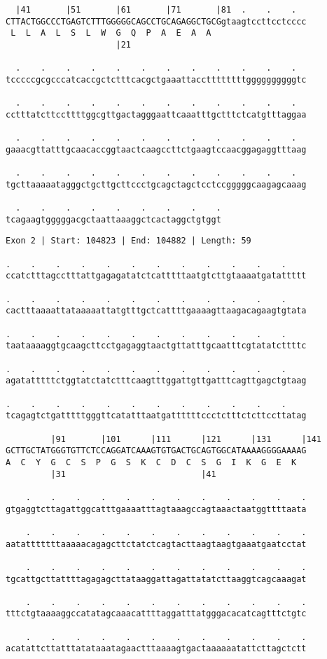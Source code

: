 \documentclass{article}
\begin{document}
\begin{Verbatim}
  |41       |51       |61       |71       |81  .    .    .  
CTTACTGGCCCTGAGTCTTTGGGGGCAGCCTGCAGAGGCTGCGgtaagtccttcctcccc
 L  L  A  L  S  L  W  G  Q  P  A  E  A  A                   
                      |21                                   
  
  .    .    .    .    .    .    .    .    .    .    .    .  
tcccccgcgcccatcaccgctctttcacgctgaaattaccttttttttggggggggggtc
  
  .    .    .    .    .    .    .    .    .    .    .    .  
cctttatcttccttttggcgttgactagggaattcaaatttgctttctcatgtttaggaa
  
  .    .    .    .    .    .    .    .    .    .    .    .  
gaaacgttatttgcaacaccggtaactcaagccttctgaagtccaacggagaggtttaag
  
  .    .    .    .    .    .    .    .    .    .    .    .  
tgcttaaaaatagggctgcttgcttccctgcagctagctcctccgggggcaagagcaaag
  
  .    .    .    .    .    .    .    .    .
tcagaagtgggggacgctaattaaaggctcactaggctgtggt
\end{Verbatim}
\newpage
\begin{Verbatim}
Exon 2 | Start: 104823 | End: 104882 | Length: 59
 
.    .    .    .    .    .    .    .    .    .    .    .    
ccatctttagcctttattgagagatatctcatttttaatgtcttgtaaaatgatattttt
  
.    .    .    .    .    .    .    .    .    .    .    .    
cactttaaaattataaaaattatgtttgctcattttgaaaagttaagacagaagtgtata
  
.    .    .    .    .    .    .    .    .    .    .    .    
taataaaaggtgcaagcttcctgagaggtaactgttatttgcaatttcgtatatcttttc
  
.    .    .    .    .    .    .    .    .    .    .    .    
agatatttttctggtatctatctttcaagtttggattgttgatttcagttgagctgtaag
  
.    .    .    .    .    .    .    .    .    .    .    .    
tcagagtctgatttttgggttcatatttaatgattttttccctctttctcttccttatag
  
         |91       |101      |111      |121      |131      |141
GCTTGCTATGGGTGTTCTCCAGGATCAAAGTGTGACTGCAGTGGCATAAAAGGGGAAAAG
A  C  Y  G  C  S  P  G  S  K  C  D  C  S  G  I  K  G  E  K  
         |31                           |41                  
  
    .    .    .    .    .    .    .    .    .    .    .    .
gtgaggtcttagattggcatttgaaaatttagtaaagccagtaaactaatggttttaata
  
    .    .    .    .    .    .    .    .    .    .    .    .
aatatttttttaaaaacagagcttctatctcagtacttaagtaagtgaaatgaatcctat
  
    .    .    .    .    .    .    .    .    .    .    .    .
tgcattgcttattttagagagcttataaggattagattatatcttaaggtcagcaaagat
  
    .    .    .    .    .    .    .    .    .    .    .    .
tttctgtaaaaggccatatagcaaacattttaggatttatgggacacatcagtttctgtc
  
    .    .    .    .    .    .    .    .    .    .    .    .
acatattcttatttatataaatagaactttaaaagtgactaaaaaatattcttagctctt
\end{Verbatim}
\end{document}
